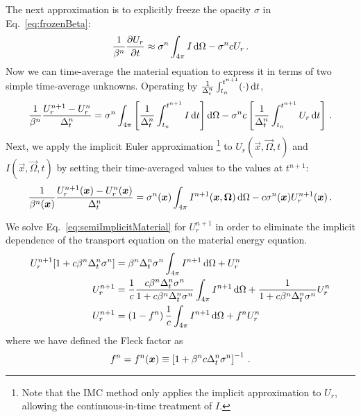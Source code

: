 The next approximation is to explicitly freeze the opacity $\sigma$ in
Eq.~\eqref{eq:frozenBeta}:
\begin{equation*}
  \frac{1}{\beta^n}
  \frac{\partial U_r}{\partial t} \approx \sigma^n \int_{4\pi}  I \mathop{}\!\mathrm{d} \Omega - \sigma^n c U_r \,.
\end{equation*}
Now we can time-average the material equation to express it in terms of two
simple time-average unknowns. Operating by
$\frac{1}{\Delta_t^n}\int_{t_n}^{t^{n+1}} (\cdot) \mathop{}\!\mathrm{d} t$,
\begin{equation*}
  \frac{1}{\beta^n}
  \frac{U_r^{n+1} - U_r^n}{\Delta_t^n} = \sigma^n \int_{4\pi} \left[
  \frac{1}{\Delta_t^n}\int_{t_n}^{t^{n+1}} I\mathop{}\!\mathrm{d} t
  \right] \mathop{}\!\mathrm{d} \Omega - \sigma^n c \left[
  \frac{1}{\Delta_t^n}\int_{t_n}^{t^{n+1}} U_r \mathop{}\!\mathrm{d} t \right]\,.
\end{equation*}
Next, we apply the implicit Euler approximation%
\footnote{Note that the IMC method only applies the implicit approximation to
$U_r$, allowing the continuous-in-time treatment of $I$.}%
to $U_r(\vec{x}, \vec{\Omega}, t)$ and $I(\vec{x}, \vec{\Omega}, t)$ by setting
their time-averaged values to
the values at $t^{n+1}$:
\begin{equation} \label{eq:semiImplicitMaterial}
  \frac{1}{\beta^n(\bm{x})}
  \frac{U_r^{n+1}(\bm{x}) - U_r^n(\bm{x})}{\Delta_t^n}
  = \sigma^n(\bm{x}) \int_{4\pi} I^{n+1}(\bm{x}, \bm{\Omega})\mathop{}\!\mathrm{d} \Omega
  - c \sigma^n(\bm{x}) U_r^{n+1}(\bm{x}) \,.
\end{equation}

We solve Eq.~\eqref{eq:semiImplicitMaterial} for $U_r^{n+1}$ in order to
eliminate the implicit dependence of the transport equation on the material
energy equation.
\begin{align} \nonumber
  U_r^{n+1} [ 1 + c \beta^n \Delta_t^n \sigma^n ]
  &= \beta^n \Delta_t^n \sigma^n\int_{4\pi} I^{n+1}\mathop{}\!\mathrm{d} \Omega + U_r^n
   \\ \nonumber
  U_r^{n+1}
  &= \frac1c \frac{ c \beta^n \Delta_t^n \sigma^n }{ 1 + c \beta^n \Delta_t^n \sigma^n}
  \int_{4\pi} I^{n+1}\mathop{}\!\mathrm{d} \Omega + \frac1{ 1 + c \beta^n \Delta_t^n \sigma^n}
  U_r^n
  \\ \label{eq:urNPlusOne}
  U_r^{n+1}
  &= \left(1 - f^n\right) \frac1c \int_{4\pi} I^{n+1}\mathop{}\!\mathrm{d} \Omega + f^n U_r^n
\end{align}
where we have defined the Fleck factor \cite{Fle1971} as
\begin{equation} \label{eq:fleckFactor}
  f^n = f^n(\bm{x}) \equiv \left[ 1 + \beta^n c \Delta_t^n \sigma^n
  \right]^{-1} \,.
\end{equation}

